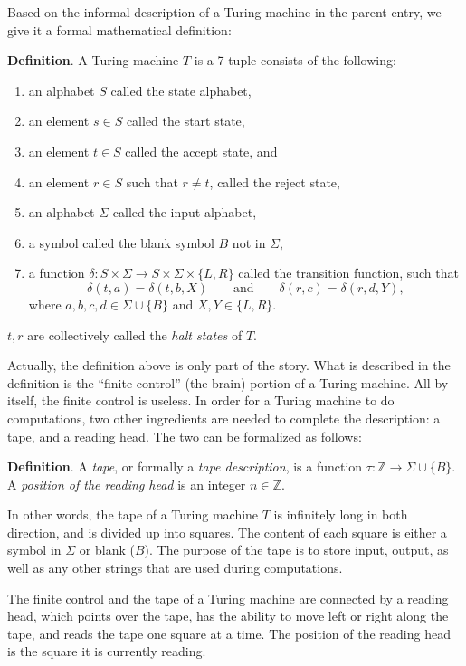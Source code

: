 \documentclass[12pt]{article}
\begin{document}
Based on the informal description of a Turing machine in the parent entry, we give it a formal mathematical definition:

\textbf{Definition}.  A Turing machine $T$ is a 7-tuple consists of the following:
\begin{enumerate}
\item an alphabet $S$ called the state alphabet,
\item an element $s\in S$ called the start state,
\item an element $t\in S$ called the accept state, and
\item an element $r\in S$ such that $r\ne t$, called the reject state,
\item an alphabet $\Sigma$ called the input alphabet,
\item a symbol called the blank symbol $B$ not in $\Sigma$,
\item a function $\delta: S\times \Sigma \to S\times \Sigma \times \lbrace L,R\rbrace$ called the transition function, such that $$\delta(t,a)=\delta(t,b,X)\qquad\mbox{and}\qquad \delta(r,c)=\delta(r,d,Y),$$
where $a,b,c,d\in \Sigma\cup\lbrace B\rbrace$ and $X,Y\in \lbrace L,R\rbrace$.
\end{enumerate}
$t,r$ are collectively called the \emph{halt states} of $T$.

Actually, the definition above is only part of the story.  What is described in the definition is the ``finite control'' (the brain) portion of a Turing machine.  All by itself, the finite control is useless.  In order for a Turing machine to do computations, two other ingredients are needed to complete the description: a tape, and a reading head.  The two can be formalized as follows:

\textbf{Definition}.  A \emph{tape}, or formally a \emph{tape description}, is a function $\tau: \mathbb{Z}\to \Sigma\cup \lbrace B\rbrace$.  A \emph{position of the reading head} is an integer $n\in \mathbb{Z}$.

In other words, the tape of a Turing machine $T$ is infinitely long in both direction, and is divided up into squares.  The content of each square is either a symbol in $\Sigma$ or blank ($B$).  The purpose of the tape is to store input, output, as well as any other strings that are used during computations.  

The finite control and the tape of a Turing machine are connected by a reading head, which points over the tape, has the ability to move left or right along the tape, and reads the tape one square at a time.  The position of the reading head is the square it is currently reading.
\end{document}
